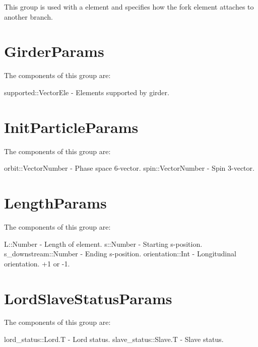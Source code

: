This group is used with a  element and specifies how the fork element attaches to
another branch. 


\section{GirderParams}
\label{s:girder.g}

The components of this group are:
\begin{example}
  supported::Vector{Ele}    - Elements supported by girder. 
\end{example}


\section{InitParticleParams}
\label{s:init.particle.g}

The components of this group are:
\begin{example}
  orbit::Vector{Number}     - Phase space 6-vector. 
  spin::Vector{Number}      - Spin 3-vector. \end{example}

\section{LengthParams}
\label{s:length.g}

The components of this group are:
\begin{example}
  L::Number               - Length of element. 
  s::Number               - Starting s-position. 
  s_downstream::Number    - Ending s-position. 
  orientation::Int        - Longitudinal orientation. +1 or -1. 
\end{example}

\section{LordSlaveStatusParams}
\label{s:lord.slave.g}
\label{s:lord.enum}
\label{s:slave.enum}

The components of this group are: \\
\begin{example}
  lord_status::Lord.T     - Lord status. 
  slave_status::Slave.T   - Slave status. 
\end{example}

